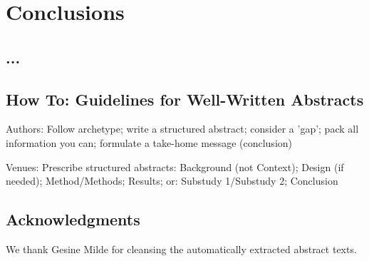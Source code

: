 \documentclass[10pt,journal,compsoc]{IEEEtran}
\newcommand{\ifarxiv}[1]{#1}  %
\begin{document}
\section{Conclusions}


\subsection{...}
\noindent


\subsection{How To: Guidelines for Well-Written Abstracts}

\noindent
Authors: Follow archetype; write a structured abstract; consider a 'gap'; pack all information you can; formulate a take-home message (conclusion)

Venues: Prescribe structured abstracts: Background (not Context); Design (if needed); Method/Methods; Results; or: Substudy 1/Substudy 2; Conclusion





\subsection*{Acknowledgments}
\noindent We thank Gesine Milde for cleansing the automatically extracted abstract texts.
	


	


\ifarxiv{}
	
\end{document}
